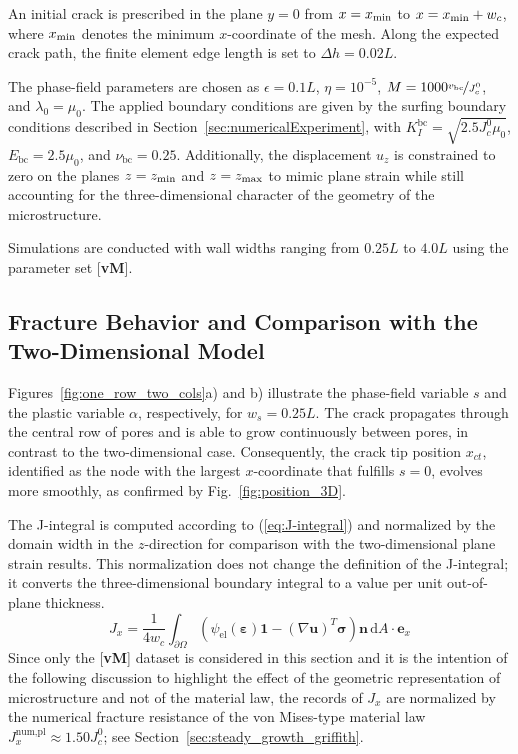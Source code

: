 \documentclass[pdflatex,sn-mathphys-num]{sn-jnl}%
\newcommand{\vMLabel}{[\textbf{vM}]\xspace}
\theoremstyle{thmstyleone}%
\theoremstyle{thmstyletwo}%
\theoremstyle{thmstylethree}%
\begin{document}
An initial crack is prescribed in the plane $y=0$ from $x=x_{\rm min}$ to $x=x_{\rm min}+w_c$, where $x_{\rm min}$ denotes the minimum $x$-coordinate of the mesh. Along the expected crack path, the finite element edge length is set to $\Delta h = 0.02L$.

The phase-field parameters are chosen as $\epsilon = 0.1L$, $\eta = 10^{-5}$, $M = 1000 \nicefrac{v_{\text{bc}}}{J_c^0}$, and $\lambda_0=\mu_0$. The applied boundary conditions are given by the surfing boundary conditions described in Section~\ref{sec:numericalExperiment}, with $K_I^{\text{bc}}=\sqrt{2.5J_c^0\mu_0}$, $E_{\text{bc}}=2.5\mu_0$, and $\nu_{\text{bc}}=0.25$. Additionally, the displacement $u_z$ is constrained to zero on the planes $z=z_{\rm min}$ and 
$z=z_{\rm max}$ to mimic plane strain while still accounting for the three-dimensional character of the geometry of the microstructure.

Simulations are conducted with wall widths ranging from $0.25L$ to $4.0L$ using the parameter set \vMLabel.

\subsection{Fracture Behavior and Comparison with the Two-Dimensional Model}
\label{sec:3D_fracture_behavior}

Figures~\ref{fig:one_row_two_cols}a) and b) illustrate the phase-field variable $s$ and the plastic variable $\alpha$, respectively, for $w_s=0.25L$. The crack propagates through the central row of pores and is able to grow continuously between pores, in contrast to the two-dimensional case. Consequently, the crack tip position $x_{ct}$, identified as the node with the largest $x$-coordinate that fulfills $s=0$, evolves more smoothly, as confirmed by Fig.~\ref{fig:position_3D}.

The J-integral is computed according to (\ref{eq:J-integral}) and normalized by the domain width in the $z$-direction for comparison with the two-dimensional plane strain results. This normalization does not change the definition of the J-integral; it converts the three-dimensional boundary integral to a value per unit out-of-plane thickness.
\begin{equation}
    J_x = \dfrac{1}{4 w_c}\int_{\partial\Omega}\left(\psi_{\text{el}}(\boldsymbol{\varepsilon})\boldsymbol{1} - (\nabla\boldsymbol{u})^T\boldsymbol{\sigma}\right)\boldsymbol{n}\,\mathrm{d}A\cdot\boldsymbol{e}_x
\end{equation}
Since only the \vMLabel dataset is considered in this section and it is the intention of the following discussion
to highlight the effect of the geometric representation of microstructure and 
not of the material law, the records of $J_x$ are normalized by the 
numerical fracture resistance of the von Mises-type material law $J_x^{\text{num,pl}}\approx1.50J_c^0$; see Section~\ref{sec:steady_growth_griffith}.
\end{document}
